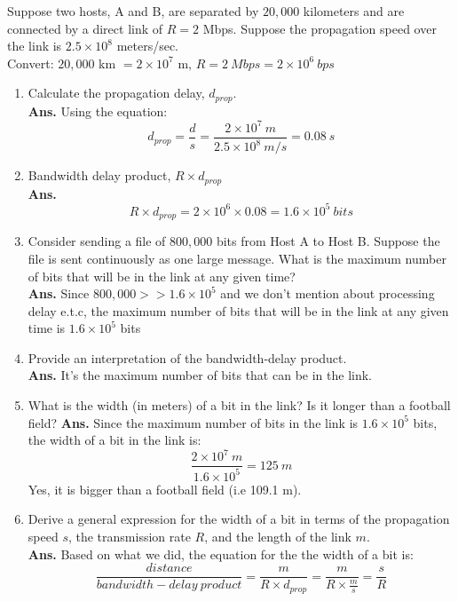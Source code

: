 \documentclass[12pt]{article}
\newenvironment{problem}[2][Problem]{\begin{trivlist}
\item[\hskip \labelsep {\bfseries #1}\hskip \labelsep {\bfseries #2.}]}{\end{trivlist}}
\begin{document}
\begin{problem}{2}
Suppose two hosts, A and B, are separated by $20,000$ kilometers and are connected by a direct
link of $R = 2$ Mbps. Suppose the propagation speed over the link is $2.5\times 10^8$ meters/sec.
\\
Convert: $20,000$ km $= 2\times 10^7$ m, $R = 2\ Mbps = 2 \times 10^6\ bps$
\begin{enumerate}
	\item[a.] Calculate the propagation delay, $d_{prop}$. 
	\\
	\textbf{Ans.} Using the equation: 
	$$d_{prop} = \frac{d}{s} = \frac{2\times 10^7\ m}{2.5 \times 10^8\ m/s} = 0.08\ s$$
	\item[b.] Bandwidth delay product,  $R \times d_{prop}$
	\\
	\textbf{Ans.} 
	$$R\times d_{prop} = 2\times 10^6 \times 0.08 = 1.6 \times 10^5\ bits$$
	\item[c.] Consider sending a file of $800,000$ bits from Host A to Host B. Suppose the file is sent	
	continuously as one large message. What is the maximum number of bits that will be
	in the link at any given time?
	\\
	\textbf{Ans.} Since $800,000 >> 1.6 \times 10^5$ and we don't mention about processing delay e.t.c, the maximum number of bits that will be in the link at any given time is $1.6 \times 10^5$ bits
	\item[d.]
	Provide an interpretation of the bandwidth-delay product.
	\\
	\textbf{Ans.} It's the maximum number of bits that can be in the link.
	\item[e.] What is the width (in meters) of a bit in the link? Is it longer than a football field?
	\textbf{Ans.} Since the maximum number of bits in the link is $1.6 \times 10^5$ bits, the width of a bit in the link is:
	$$\frac{2\times 10^7\ m}{1.6\times 10^5} = 125\ m$$
	Yes, it is bigger than a football field (i.e 109.1 m).
	\item[f.] Derive a general expression for the width of a bit in terms of the propagation speed $s$,
	the transmission rate $R$, and the length of the link $m$.
	\\
	\textbf{Ans.} Based on what we did, the equation for the the width of a bit is:
	$$\frac{distance}{bandwidth-delay\ product} = \frac{m}{R\times d_{prop}} = \frac{m}{R \times \frac{m}{s}} =  \frac{s}{R}$$
\end{enumerate}
\end{problem}
\end{document}
